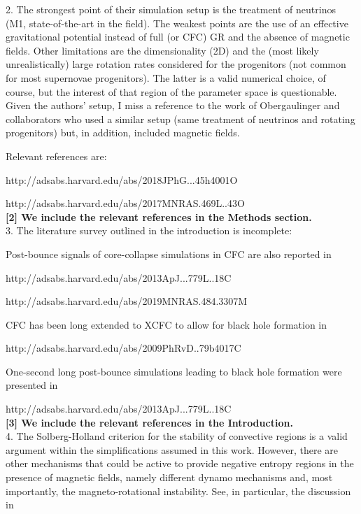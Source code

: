 \documentclass[11pt]{article}
\begin{document}
2. The strongest point of their simulation setup is the treatment of neutrinos 
(M1, state-of-the-art in the field). The weakest points are the use of an 
effective gravitational potential instead of full (or CFC) GR and the absence of 
magnetic fields. Other limitations are the dimensionality (2D) and the (most likely unrealistically) large rotation rates considered for the progenitors (not common for most supernovae progenitors). The latter is a valid numerical choice, of course, but the interest of that region of the parameter space is questionable.\\

Given the authors' setup, I miss a reference to the work of Obergaulinger and
collaborators who used a similar setup (same treatment of neutrinos and rotating progenitors) but, in addition, included magnetic fields.

Relevant references are:

http://adsabs.harvard.edu/abs/2018JPhG...45h4001O

http://adsabs.harvard.edu/abs/2017MNRAS.469L..43O\\

\textbf{[2] We include the relevant references in the Methods section.}\\

3. The literature survey outlined in the introduction is incomplete:

Post-bounce signals of core-collapse simulations in CFC are also reported in

http://adsabs.harvard.edu/abs/2013ApJ...779L..18C

http://adsabs.harvard.edu/abs/2019MNRAS.484.3307M

CFC has been long extended to XCFC to allow for black hole formation in

http://adsabs.harvard.edu/abs/2009PhRvD..79b4017C

One-second long post-bounce simulations leading to black hole formation were
presented in 

http://adsabs.harvard.edu/abs/2013ApJ...779L..18C\\

\textbf{[3] We include the relevant references in the Introduction.}\\


4. The Solberg-Holland criterion for the stability of convective regions is
a valid argument within the simplifications assumed in this work. However, 
there are other mechanisms that could be active to provide negative entropy 
regions in the presence of magnetic fields, namely different dynamo mechanisms 
and, most importantly, the magneto-rotational instability. See, in particular, 
the discussion in  
\end{document}
